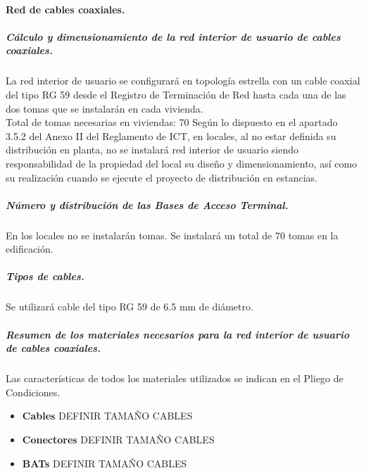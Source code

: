 \paragraph{Red de cables coaxiales.}
\subparagraph{Cálculo y dimensionamiento de la red interior de usuario de cables coaxiales.}
La red interior de usuario se configurará en topología estrella con un cable coaxial del tipo RG 59 desde el
Registro de Terminación de Red hasta cada una de las dos tomas que se instalarán en cada
vivienda.\\
Total de tomas necesarias en viviendas: 70
Según lo dispuesto en el apartado 3.5.2 del Anexo II del Reglamento de ICT, en locales, al no
estar definida su distribución en planta, no se instalará red interior de usuario siendo
responsabilidad de la propiedad del local su diseño y dimensionamiento, así como su realización
cuando se ejecute el proyecto de distribución en estancias.
\subparagraph{Número y distribución de las Bases de Acceso Terminal.}
En los locales no se instalarán tomas.
Se instalará un total de 70 tomas en la edificación.
\subparagraph{Tipos de cables.}
Se utilizará cable del tipo RG 59 de 6.5 mm de diámetro.
\subparagraph{Resumen de los materiales necesarios para la red interior de usuario de cables coaxiales.}
Las características de todos los materiales utilizados se indican en el Pliego de Condiciones.
\begin{itemize}
	\item \textbf{Cables}
	DEFINIR TAMAÑO CABLES
\end{itemize}
\begin{itemize}
	\item \textbf{Conectores}
	DEFINIR TAMAÑO CABLES
\end{itemize}
\begin{itemize}
	\item \textbf{BATs}
	DEFINIR TAMAÑO CABLES
\end{itemize}